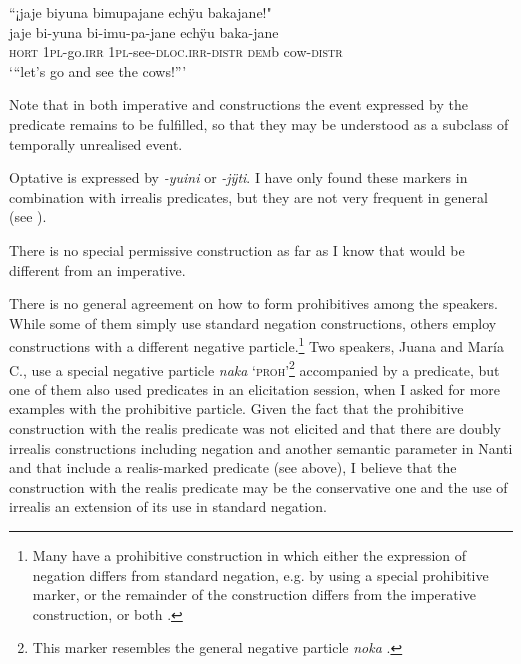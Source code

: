 \ea\label{ex:HORT-IRR}
\begingl 
\glpreamble “¡jaje biyuna bimupajane echÿu bakajane!"\\
\gla jaje bi-yuna bi-imu-pa-jane echÿu baka-jane\\ 
\glb \textsc{hort} 1\textsc{pl}-go.\textsc{irr} 1\textsc{pl}-see-\textsc{dloc.irr}-\textsc{distr} \textsc{dem}b cow-\textsc{distr}\\ 
\glft ‘“let’s go and see the cows!”’
 \trailingcitation{[mxx-n151017l-1.38]}
\xe

Note that in both imperative and  constructions the event expressed by the predicate remains to be fulfilled, so that they may be understood as a subclass of temporally unrealised event.

Optative is expressed by \textit{-yuini} or \textit{-jÿti}. I have only found these markers in combination with irrealis predicates, but they are not very frequent in general (see ).

There is no special permissive construction as far as I know that would be different from an imperative.

There is no general agreement on how to form prohibitives among the speakers. While some of them simply use standard negation constructions, others employ constructions with a different negative particle.\footnote{Many  have a prohibitive construction in which either the expression of negation differs from standard negation, e.g. by using a special prohibitive marker, or the remainder of the construction differs from the imperative construction, or both \citep[270--271]{Michael2014b}.} 
Two speakers, Juana and María C., use a special negative particle \textit{naka} ‘\textsc{proh}’\footnote{This marker resembles the  general negative particle \textit{noka} \citep[cf.][338]{Danielsen2007}. } accompanied by a  predicate, but one of them also used  predicates in an elicitation session, when I asked for more examples with the prohibitive particle. Given the fact that the prohibitive construction with the realis predicate was not elicited and that there are doubly irrealis constructions including negation and another semantic parameter in Nanti and  that include a realis-marked predicate (see  above), I believe that the construction with the realis predicate may be the conservative one and the use of irrealis an extension of its use in standard negation.

